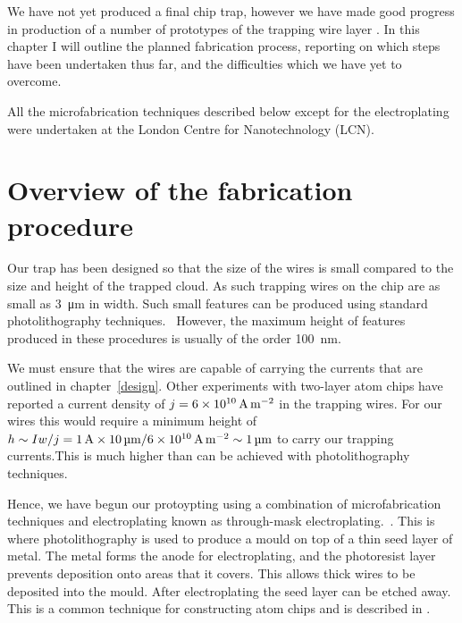 We have not yet produced a final chip trap, however we have made good progress
in production of a number of prototypes of the trapping wire layer . In this chapter I will outline the
planned fabrication process, reporting on which steps have been undertaken thus
far, and the difficulties which we have yet to overcome.

All the microfabrication techniques described below except for the
electroplating were undertaken at the London Centre for Nanotechnology (LCN). 


\section{Overview of the fabrication procedure}

Our trap has been designed so that the size of the wires is small compared to
the size and height of the trapped cloud. As such trapping wires on the chip
are as small as \SI{3}{\micro\meter} in width. Such small features can be
produced using standard photolithography techniques.~\cite{Madou2002} However,
the maximum height of features produced in these procedures is usually of the
order \SI{100}{\nano\meter}.

We must ensure that the wires are capable of carrying the currents that are
outlined in chapter~\ref{design}.  Other experiments with two-layer atom chips
have reported a current density of $j=\SI{6E10}{\ampere\per\meter\squared}$ in
the trapping wires. For our wires this would require a minimum height of $h
\sim I w/j = \SI{1}{\ampere} \times
\SI{10}{\micro\meter}/\SI{6E10}{\ampere\per\meter\squared} \sim
\SI{1}{\micro\meter}$  to carry our trapping currents.This is much higher than
can be achieved with photolithography techniques.

Hence, we have begun our protoypting using a combination of microfabrication
techniques and electroplating known as through-mask
electroplating.~\cite{Ruythooren_2000}. This is where photolithography is used
to produce a mould on top of a thin seed layer of metal. The metal forms the
anode for electroplating, and the photoresist layer prevents deposition onto
areas that it covers. This allows thick wires to be deposited into the mould.
After electroplating the seed layer can be etched away.  This is a common
technique for constructing atom chips and is described in .

